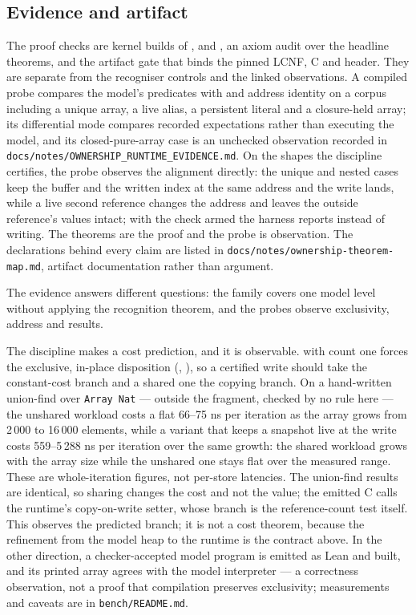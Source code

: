 \documentclass[a4paper,UKenglish,cleveref]{lipics-v2021}
\begin{document}
\subsection{Evidence and artifact}\label{sec:map}
The proof checks are kernel builds of ,  and
, an axiom audit over the headline theorems, and the artifact
gate that binds the pinned LCNF, C and header. They are separate from the recogniser controls and the linked observations. A compiled probe
compares the model's predicates with  and address
identity on a corpus including a unique array, a live alias, a persistent literal
and a closure-held array; its differential mode
compares recorded expectations rather than executing the  model,
and its closed-pure-array case is an unchecked observation recorded in
\texttt{docs/notes/OWNERSHIP\_RUNTIME\_EVIDENCE.md}. On the shapes the discipline certifies, the probe observes the alignment
directly: the unique and nested cases keep the buffer and the written index at
the same address and the write lands, while a live second reference changes the
address and leaves the outside reference's values intact; with the check armed
the harness reports instead of writing. The theorems are the proof and the probe
is observation. The declarations behind every claim are listed in
\texttt{docs/notes/ownership-theorem-map.md}, artifact documentation rather than
argument.

The evidence answers different questions: the family covers one model level without
applying the recognition theorem, and the probes observe exclusivity, address and
results.

The discipline makes a cost prediction, and it is observable. 
with count one forces the exclusive, in-place disposition (,
), so a certified write should take the
constant-cost branch and a shared one the copying branch. On a hand-written
union-find over \texttt{Array Nat} --- outside the fragment, checked by no rule
here --- the unshared workload costs a flat 66--75 ns per iteration as the array
grows from 2\,000 to 16\,000 elements, while a variant that keeps a snapshot live
at the write costs 559--5\,288 ns per iteration over the same growth: the shared
workload grows with the array size while the unshared one stays flat over the
measured range. These are whole-iteration figures, not per-store latencies. The
union-find results are identical, so sharing changes the cost and not the value;
the emitted C calls the runtime's copy-on-write setter, whose branch is the
reference-count test itself. This observes the predicted branch; it is not a cost
theorem, because the refinement from the model heap to the runtime is the contract
above. In the other direction, a checker-accepted model program is emitted as Lean
and built, and its printed array agrees with the model interpreter --- a
correctness observation, not a proof that compilation preserves exclusivity;
measurements and caveats are in \texttt{bench/README.md}.
\end{document}
